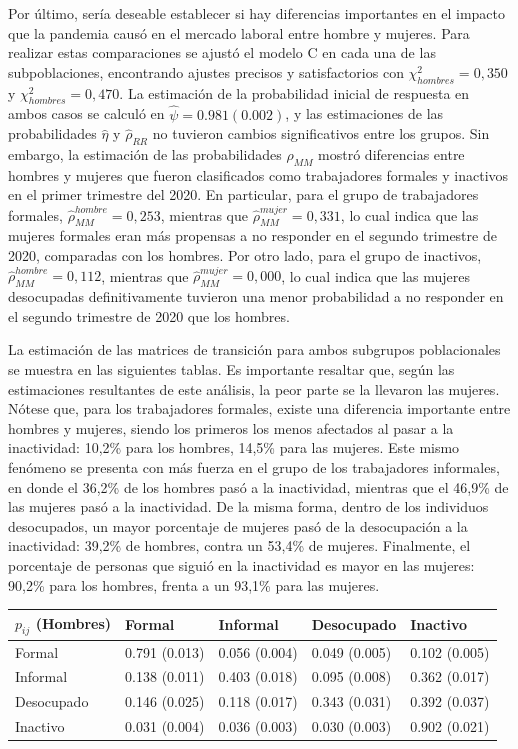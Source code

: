 \documentclass[
  12pt,
  spanish,
]{book}
\begin{document}
Por último, sería deseable establecer si hay diferencias importantes en el impacto que la pandemia causó en el mercado laboral entre hombre y mujeres. Para realizar estas comparaciones se ajustó el modelo C en cada una de las subpoblaciones, encontrando ajustes precisos y satisfactorios con \(\chi^2_{hombres} = 0,350\) y \(\chi^2_{hombres} = 0,470\). La estimación de la probabilidad inicial de respuesta en ambos casos se calculó en \(\hat{\psi}=0.981 (0.002)\), y las estimaciones de las probabilidades \(\hat{\eta}\) y \(\hat{\rho}_{RR}\) no tuvieron cambios significativos entre los grupos. Sin embargo, la estimación de las probabilidades \(\hat{\rho}_{MM}\) mostró diferencias entre hombres y mujeres que fueron clasificados como trabajadores formales y inactivos en el primer trimestre del 2020. En particular, para el grupo de trabajadores formales, \(\hat{\rho}_{MM}^{hombre} = 0,253\), mientras que \(\hat{\rho}_{MM}^{mujer} = 0,331\), lo cual indica que las mujeres formales eran más propensas a no responder en el segundo trimestre de 2020, comparadas con los hombres. Por otro lado, para el grupo de inactivos, \(\hat{\rho}_{MM}^{hombre} = 0,112\), mientras que \(\hat{\rho}_{MM}^{mujer} = 0,000\), lo cual indica que las mujeres desocupadas definitivamente tuvieron una menor probabilidad a no responder en el segundo trimestre de 2020 que los hombres.

La estimación de las matrices de transición para ambos subgrupos poblacionales se muestra en las siguientes tablas. Es importante resaltar que, según las estimaciones resultantes de este análisis, la peor parte se la llevaron las mujeres. Nótese que, para los trabajadores formales, existe una diferencia importante entre hombres y mujeres, siendo los primeros los menos afectados al pasar a la inactividad: 10,2\% para los hombres, 14,5\% para las mujeres. Este mismo fenómeno se presenta con más fuerza en el grupo de los trabajadores informales, en donde el 36,2\% de los hombres pasó a la inactividad, mientras que el 46,9\% de las mujeres pasó a la inactividad. De la misma forma, dentro de los individuos desocupados, un mayor porcentaje de mujeres pasó de la desocupación a la inactividad: 39,2\% de hombres, contra un 53,4\% de mujeres. Finalmente, el porcentaje de personas que siguió en la inactividad es mayor en las mujeres: 90,2\% para los hombres, frenta a un 93,1\% para las mujeres.

\begin{longtable}[]{@{}lllll@{}}
\toprule
\(p_{ij}\) (Hombres) & Formal & Informal & Desocupado & Inactivo \\
\midrule
\endhead
Formal & 0.791 (0.013) & 0.056 (0.004) & 0.049 (0.005) & 0.102 (0.005) \\
Informal & 0.138 (0.011) & 0.403 (0.018) & 0.095 (0.008) & 0.362 (0.017) \\
Desocupado & 0.146 (0.025) & 0.118 (0.017) & 0.343 (0.031) & 0.392 (0.037) \\
Inactivo & 0.031 (0.004) & 0.036 (0.003) & 0.030 (0.003) & 0.902 (0.021) \\
\bottomrule
\end{longtable}
\end{document}
